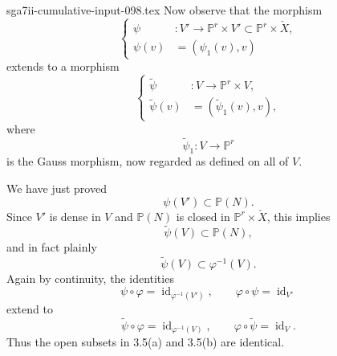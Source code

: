 \begin{filecontents*}{sga7ii-cumulative-input-098.tex}
Now observe that the morphism
\begin{equation}\tag{3.6.13}
\left\{
\begin{aligned}
\psi &:V'\longrightarrow
  \mathbb P^r\times V'\subset\mathbb P^r\times\check X,\\
\psi(v)&=(\psi_1(v),v)
\end{aligned}
\right.
\end{equation}
extends to a morphism
\begin{equation}\tag{3.6.14}
\left\{
\begin{aligned}
\widetilde\psi &:V\longrightarrow\mathbb P^r\times V,\\
\widetilde\psi(v)&=(\widetilde\psi_1(v),v),
\end{aligned}
\right.
\end{equation}
where
\begin{equation}\tag{3.6.15}
\widetilde\psi_1:V\longrightarrow\mathbb P^r
\end{equation}
is the Gauss morphism, now regarded as defined on all of $V$.

We have just proved
\begin{equation}\tag{3.6.16}
\psi(V')\subset\mathbb P(N).
\end{equation}
Since $V'$ is dense in $V$ and $\mathbb P(N)$ is closed in
$\mathbb P^r\times\check X$, this implies
\begin{equation}\tag{3.6.17}
\widetilde\psi(V)\subset\mathbb P(N),
\end{equation}
and in fact plainly
\begin{equation}\tag{3.6.18}
\widetilde\psi(V)\subset\varphi^{-1}(V).
\end{equation}
Again by continuity, the identities
\[
\psi\circ\varphi=\operatorname{id}_{\varphi^{-1}(V')},
\qquad
\varphi\circ\psi=\operatorname{id}_{V'}
\]
extend to
\[
\widetilde\psi\circ\varphi=\operatorname{id}_{\varphi^{-1}(V)},
\qquad
\varphi\circ\widetilde\psi=\operatorname{id}_{V}.
\]
Thus the open subsets in 3.5(a) and 3.5(b) are identical.


\end{filecontents*}
